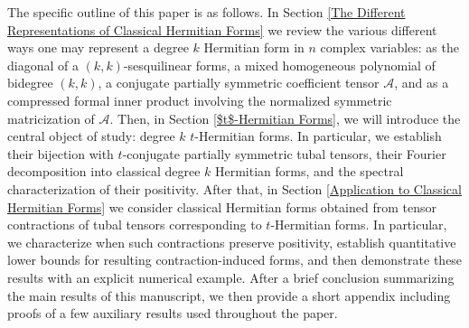 \documentclass[11pt]{article}
\begin{document}
The specific outline of this paper is as follows. In Section \ref{The Different Representations of Classical Hermitian Forms} we review the various different ways one may represent a degree $k$ Hermitian form in $n$ complex variables: as the diagonal of a $(k,k)$-sesquilinear forms, a mixed homogeneous polynomial of bidegree $(k,k)$, a conjugate partially symmetric coefficient tensor $\mathcal{A}$, and as a compressed formal inner product involving the normalized symmetric matricization of $\mathcal{A}$. Then, in Section \ref{$t$-Hermitian Forms}, we will introduce the central object of study: degree $k$ $t$-Hermitian forms. In particular, we establish their bijection with $t$-conjugate partially symmetric tubal tensors, their Fourier decomposition into classical degree $k$ Hermitian forms, and the spectral characterization of their positivity. After that, in Section \ref{Application to Classical Hermitian Forms} we consider classical Hermitian forms obtained from tensor contractions of tubal tensors corresponding to $t$-Hermitian forms. In particular, we characterize when such contractions preserve positivity, establish quantitative lower bounds for resulting contraction-induced forms, and then demonstrate these results with an explicit numerical example. After a brief conclusion summarizing the main results of this manuscript, we then provide a short appendix including proofs of a few auxiliary results used throughout the paper. 
\end{document}
